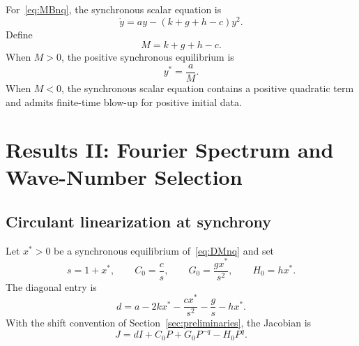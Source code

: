 \documentclass[11pt, reqno]{amsart}
\theoremstyle{definition}
\theoremstyle{remark}
\begin{document}
	For~\eqref{eq:MBnq}, the synchronous scalar equation is
	\[
	\dot y
	=a y-(k+g+h-c)y^2.
	\]
	Define
	\begin{equation}
		\label{eq:bilinear-M}
		M=k+g+h-c.
	\end{equation}
	When $M>0$, the positive synchronous equilibrium is
	\begin{equation}
		\label{eq:bilinear-sync}
		y^*=\frac{a}{M}.
	\end{equation}
	When $M<0$, the synchronous scalar equation contains a positive quadratic term
	and admits finite-time blow-up for positive initial data.
	
	
	\section{Results II: Fourier Spectrum and Wave-Number Selection}
	\label{sec:spectrum}
	
	\subsection{Circulant linearization at synchrony}
	
	Let $x^*>0$ be a synchronous equilibrium of~\eqref{eq:DMnq} and set
	\begin{equation}
		\label{eq:linear-coefficients}
		s=1+x^*,
		\qquad
		C_0=\frac{c}{s},
		\qquad
		G_0=\frac{g x^*}{s^2},
		\qquad
		H_0=h x^*.
	\end{equation}
	The diagonal entry is
	\begin{equation}
		\label{eq:d-diagonal}
		d
		=
		a-2kx^*
		-\frac{c x^*}{s^2}
		-\frac{g}{s}
		-h x^*.
	\end{equation}
	With the shift convention of Section~\ref{sec:preliminaries}, the Jacobian is
	\begin{equation}
		\label{eq:circulant-J}
		J
		=
		dI+C_0P+G_0P^{-q}-H_0P^q.
	\end{equation}
	
\end{document}
